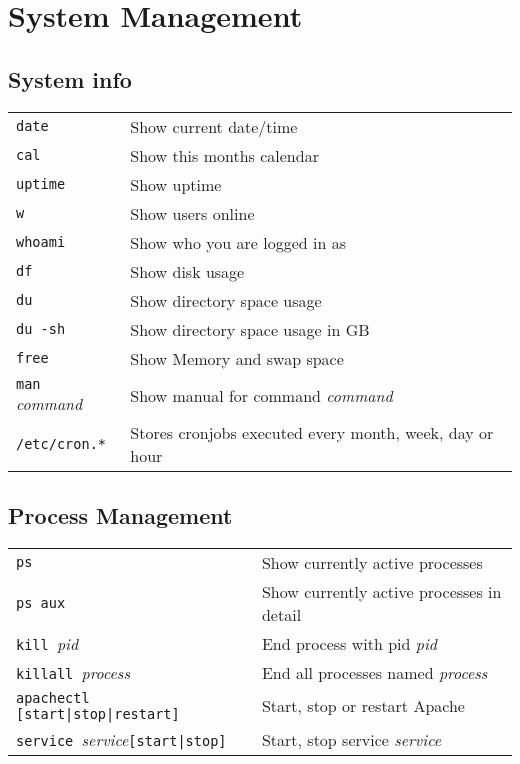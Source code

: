 \section{System Management}
\subsection{System info}
\begin{tabular}{@{}p{\the\MyLen}%
				@{}p{\linewidth-\the\MyLen}}
	\verb!date!		& Show current date/time\\
	\verb!cal!		& Show this months calendar\\
	\verb!uptime!	& Show uptime\\
	\verb!w!		& Show users online\\
	\verb!whoami!	& Show who you are logged in as\\
	\verb!df!		& Show disk usage\\
	\verb!du!		& Show directory space usage\\
	\verb!du -sh!	& Show directory space usage in GB\\
	\verb!free!		& Show Memory and swap space\\
	\verb!man !\textit{command} & Show manual for command \textit{command}\\
	\verb!/etc/cron.*! & Stores cronjobs executed every month, week, day or hour\\
\end{tabular}

\subsection{Process Management}
\begin{tabular}{@{}p{\the\MyLen}%
				@{}p{\linewidth-\the\MyLen}}
	\verb!ps!						& Show currently active processes\\
	\verb!ps aux!					& Show currently active processes in detail\\
	\verb!kill !\textit{pid}		& End process with pid \textit{pid}\\
	\verb!killall !\textit{process}	& End all processes named \textit{process}\\
	\verb!apachectl [start|stop|restart]! & Start, stop or restart Apache\\
	\verb!service !\textit{service}\verb![start|stop]! & Start, stop service \textit{service}\\
\end{tabular}
